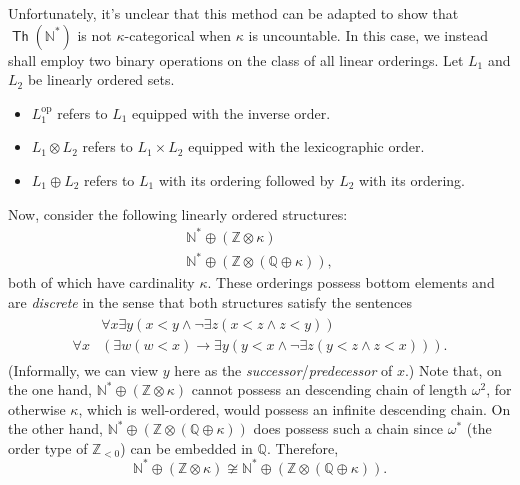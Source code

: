 \documentclass[10pt,letterpaper,cm]{nupset}
\theoremstyle{definition}
\theoremstyle{theorem}
\theoremstyle{remark}
\newcommand{\N}{\mathbb N}
\newcommand{\Q}{\mathbb Q}
\newcommand{\Z}{\mathbb Z}
\newcommand{\1}{\mathbb{1}}
\newcommand{\0}{\vec 0}
\DeclareMathOperator{\op}{op}
\DeclareMathOperator{\thh}{\mathsf{Th}}
\begin{document}
\begin{solution}
Unfortunately, it's unclear that this method can be adapted to show that $\thh(\N^{\ast})$ is not $\kappa$-categorical when $\kappa$ is uncountable. In this case, we instead shall employ two binary  operations on the class of all linear orderings.
Let $L_1$ and $L_2$ be linearly ordered sets.
\begin{itemize}
\item $L_1^{\op}$ refers to $L_1$ equipped with the inverse order.
\item $L_1 \otimes L_2$ refers to $L_1 \times L_2$ equipped with the lexicographic order.
\item ${L_1 \oplus L_2}$ refers to $L_1$ with its ordering followed by $L_2$ with its ordering.
\end{itemize}
Now, consider the following linearly ordered structures:
\begin{gather*}
 {\N^{\ast} \oplus \left(\Z \otimes\kappa\right)}
\\ {\N^{\ast}  \oplus  \left(\Z \otimes\left(\Q  \oplus\kappa\right)\right)},
\end{gather*} both of which have cardinality $\kappa$.
These orderings possess bottom elements and are \textit{discrete} in the sense that both structures satisfy the sentences
\begin{align}
\begin{split}
& \forall{x}\exists{y}\left(x<y \land \neg{\exists{z}\left(x<z \land z<y\right)}\right) \\
 \forall{x}&\left(\exists{w}\left(w < x\right)\rightarrow \exists{y}\left(y<x \land \neg{\exists{z}\left(y<z \land z<x\right)}\right)\right).
\end{split} \label{eqn:disc}
\end{align}
(Informally, we can view $y$ here as the \textit{successor}/\textit{predecessor} of $x$.) Note that, on the one hand, $ {\N^{\ast}  \oplus \left(\Z \otimes\kappa\right)}$ cannot possess an descending chain of length $\omega^2$, for otherwise $\kappa$, which is well-ordered, would possess an infinite descending chain. On the other hand, ${\N^{\ast}  \oplus  \left(\Z \otimes\left(\Q  \oplus \kappa\right)\right)}$ does possess such a chain since $\omega^{\ast}$ (the order type of $\Z_{<0}$) can be embedded in $\Q$. Therefore, \[
{\N^{\ast}  \oplus \left(\Z \otimes\kappa\right)} \not\cong {\N^{\ast}  \oplus  \left(\Z \otimes\left(\Q  \oplus\kappa\right)\right)}.
\]


\end{solution}
\end{document}

